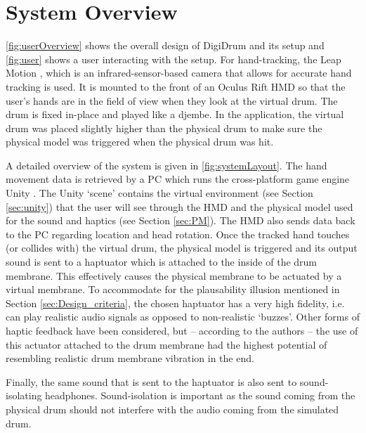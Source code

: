     \section{System Overview} \label{sec:sys}
    
    \autoref{fig:userOverview} shows the overall design of DigiDrum and its setup and \autoref{fig:user} shows a user interacting with the setup. For hand-tracking, the Leap Motion \cite{leapwebsite}, which is an infrared-sensor-based camera that allows for accurate hand tracking is used. It is mounted to the front of an Oculus Rift HMD so that the user's hands are in the field of view when they look at the virtual drum. The drum is fixed in-place and played like a djembe. In the application, the virtual drum was placed slightly higher than the physical drum to make sure the physical model was triggered when the physical drum was hit.
    
    A detailed overview of the system is given in \autoref{fig:systemLayout}. The hand movement data is retrieved by a PC which runs the cross-platform game engine Unity \cite{unity}. The Unity `scene' contains the virtual environment (see Section \ref{sec:unity}) that the user will see through the HMD and the physical model used for the sound and haptics (see Section \ref{sec:PM}). The HMD also sends data back to the PC regarding location and head rotation. Once the tracked hand touches (or collides with) the virtual drum, the physical model is triggered and its output sound is sent to a haptuator which is attached to the inside of the drum membrane. This effectively causes the physical membrane to be actuated by a virtual membrane. To accommodate for the plausability illusion mentioned in Section \ref{sec:Design_criteria}, the chosen haptuator has a very high fidelity, i.e. can play realistic audio signals as opposed to non-realistic `buzzes'. Other forms of haptic feedback have been considered, but -- according to the authors -- the use of this actuator attached to the drum membrane had the highest potential of resembling realistic drum membrane vibration in the end.
    
    Finally, the same sound that is sent to the haptuator is also sent to sound-isolating headphones. Sound-isolation is important as the sound coming from the physical drum should not interfere with the audio coming from the simulated drum.
    
